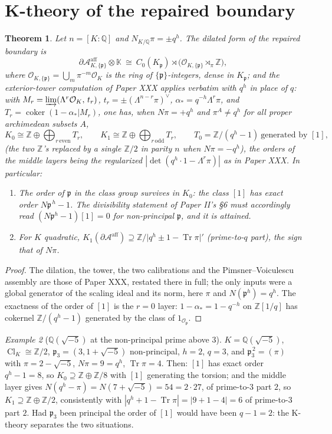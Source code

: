\documentclass[11pt]{amsart}
\newtheorem{theorem}{Theorem}[section]
\theoremstyle{remark}
\newtheorem{example}[theorem]{Example}
\newcommand{\OK}{\mathcal{O}_K}
\newcommand{\Op}{\mathcal{O}_\pp}
\newcommand{\pp}{\mathfrak{p}}
\newcommand{\Z}{\mathbb{Z}}
\newcommand{\Q}{\mathbb{Q}}
\newcommand{\K}{\mathbb{K}}
\newcommand{\Ns}{N}
\newcommand{\Tr}{\operatorname{Tr}}
\newcommand{\Cl}{\operatorname{Cl}}
\newcommand{\Aaff}{\mathcal{A}^{\mathrm{aff}}}
\begin{document}
\section{K-theory of the repaired boundary}\label{sec:ktheory}

\begin{theorem}\label{thm:ktheory}
Let $n=[K:\Q]$ and $\Ns_{K/\Q}\pi=\pm q^{h}$. The dilated form of the repaired boundary is
\[
\partial\Aaff_{K,\{\pp\}}\otimes\K\ \cong\
C_0(K_\pp)\rtimes\bigl(\mathcal O_{K,\{\pp\}}\rtimes_\pi\Z\bigr),
\]
where $\mathcal O_{K,\{\pp\}}=\bigcup_m\pi^{-m}\OK$ is the ring of $\{\pp\}$-integers,
dense in $K_\pp$; and the exterior-tower computation of Paper XXX applies verbatim with
$q^h$ in place of $q$: with $M_r=\varinjlim(\Lambda^r\OK,\,t_r)$,
$t_r=\pm(\Lambda^{n-r}\pi)^\vee$, $\alpha_*=q^{-h}\Lambda^r\pi$, and
$T_r=\operatorname{coker}(1-\alpha_*|M_r)$, one has, when $\Ns\pi=+q^h$ and
$\pi^A\ne q^h$ for all proper archimedean subsets $A$,
\[
K_0\cong\Z\oplus\bigoplus_{r\,\mathrm{even}}T_r,\qquad
K_1\cong\Z\oplus\bigoplus_{r\,\mathrm{odd}}T_r,\qquad
T_0=\Z/(q^{h}-1)\ \text{generated by }[1],
\]
(the two $\Z$'s replaced by a single $\Z/2$ in parity $n$ when $\Ns\pi=-q^h$), the orders
of the middle layers being the regularized $|\det(q^h\cdot1-\Lambda^r\pi)|$ as in Paper
XXX. In particular:
\begin{enumerate}
\item \emph{The order of $\pp$ in the class group survives in $K_0$}: the class $[1]$ has
exact order $\Ns\pp^{\,h}-1$. The divisibility statement of Paper II's \S6 must
accordingly read $(\Ns\pp^{h}-1)[1]=0$ for non-principal $\pp$, and it is attained.
\item For $K$ quadratic, $K_1(\partial\Aaff)\supseteq\Z/\bigl|q^h\pm1-\Tr\pi\bigr|'$
(prime-to-$q$ part), the sign that of $\Ns\pi$.
\end{enumerate}
\end{theorem}

\begin{proof}
The dilation, the tower, the two calibrations and the Pimsner--Voiculescu \cite{PV} assembly are
those of Paper XXX, restated there in full; the only inputs were a global generator of the
scaling ideal and its norm, here $\pi$ and $\Ns(\pp^h)=q^h$. The exactness of the order of
$[1]$ is the $r=0$ layer: $1-\alpha_*=1-q^{-h}$ on $\Z[1/q]$ has cokernel $\Z/(q^h-1)$
generated by the class of $1_{\Op}$.
\end{proof}

\begin{example}[$\Q(\sqrt{-5})$ at the non-principal prime above $3$]\label{ex:sqrt5}
$K=\Q(\sqrt{-5})$, $\Cl_K\cong\Z/2$, $\pp_3=(3,1+\sqrt{-5})$ non-principal, $h=2$,
$q=3$, and $\pp_3^{\,2}=(\pi)$ with $\pi=2-\sqrt{-5}$, $\Ns\pi=9=q^h$, $\Tr\pi=4$. Then:
$[1]$ has exact order $q^h-1=8$, so $K_0\supseteq\Z\oplus\Z/8$ with $[1]$ generating the
torsion; and the middle layer gives
$\Ns(q^h-\pi)=\Ns(7+\sqrt{-5})=54=2\cdot27$, of prime-to-$3$ part $2$, so
$K_1\supseteq\Z\oplus\Z/2$, consistently with
$|q^h+1-\Tr\pi|=|9+1-4|=6$ of prime-to-$3$ part $2$. Had $\pp_3$ been principal the
order of $[1]$ would have been $q-1=2$: the K-theory separates the two situations.
\end{example}
\end{document}
